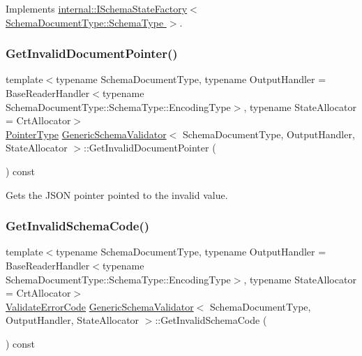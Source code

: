 Implements \hyperlink{classinternal_1_1ISchemaStateFactory_addfcf00963cc777edf642b204f07c8d6}{internal\+::\+I\+Schema\+State\+Factory$<$ Schema\+Document\+Type\+::\+Schema\+Type $>$}.

\mbox{\label{classGenericSchemaValidator_ac10a88c4dc138bbdbe2afd041658a3b0}} 
\subsubsection{\texorpdfstring{Get\+Invalid\+Document\+Pointer()}{GetInvalidDocumentPointer()}}
{\footnotesize\ttfamily template$<$typename Schema\+Document\+Type, typename Output\+Handler = Base\+Reader\+Handler$<$typename Schema\+Document\+Type\+::\+Schema\+Type\+::\+Encoding\+Type$>$, typename State\+Allocator = Crt\+Allocator$>$ \\
\hyperlink{classGenericSchemaValidator_ae0c6c9a9c0ff6bae80e75c6705f2668b}{Pointer\+Type} \hyperlink{classGenericSchemaValidator}{Generic\+Schema\+Validator}$<$ Schema\+Document\+Type, Output\+Handler, State\+Allocator $>$\+::Get\+Invalid\+Document\+Pointer (\begin{DoxyParamCaption}{ }\end{DoxyParamCaption}) const\hspace{0.3cm}{\ttfamily [inline]}}



Gets the J\+S\+ON pointer pointed to the invalid value. 

\mbox{\label{classGenericSchemaValidator_aeba2093eb93f77b239e9b4c27219c982}} 
\subsubsection{\texorpdfstring{Get\+Invalid\+Schema\+Code()}{GetInvalidSchemaCode()}}
{\footnotesize\ttfamily template$<$typename Schema\+Document\+Type, typename Output\+Handler = Base\+Reader\+Handler$<$typename Schema\+Document\+Type\+::\+Schema\+Type\+::\+Encoding\+Type$>$, typename State\+Allocator = Crt\+Allocator$>$ \\
\hyperlink{group__RAPIDJSON__ERRORS_ga2e1f88f94a5d9a6817a5de0ed2f0105a}{Validate\+Error\+Code} \hyperlink{classGenericSchemaValidator}{Generic\+Schema\+Validator}$<$ Schema\+Document\+Type, Output\+Handler, State\+Allocator $>$\+::Get\+Invalid\+Schema\+Code (\begin{DoxyParamCaption}{ }\end{DoxyParamCaption}) const\hspace{0.3cm}{\ttfamily [inline]}}



